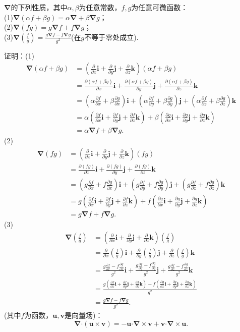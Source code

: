 \documentclass[12pt,UTF8]{ctexart}
\newcommand{\pp}[2]{\frac{\partial #1}{\partial #2}}
\begin{document}
\begin{enumerate}
$\bm\nabla$的下列性质，其中$\alpha,\beta$为任意常数，$f,g$为任意可微函数：\\
(1)$\bm\nabla(\alpha f+\beta g)=\alpha\bm\nabla+\beta\bm\nabla g$；\\
(2)$\bm\nabla(fg)=g\bm\nabla f+f\bm\nabla g$；\\
(3)$\bm\nabla(\frac fg)=\frac{g\bm\nabla f-f\bm\nabla g}{g^2}$(在$g$不等于零处成立).

证明：(1)\[\begin{split}
\bm\nabla(\alpha f+\beta g)&=(\pp{}x\bm i+\pp{}y\bm j+\pp{}z\bm k)(\alpha f+\beta g)\\
&=\pp{(\alpha f+\beta g)}x\bm i+\pp{(\alpha f+\beta g)}y\bm j+\pp{(\alpha f+\beta g)}z\bm k\\
&=(\alpha\pp fx+\beta\pp gx)\bm i+(\alpha\pp fy+\beta\pp gy)\bm j+(\alpha\pp fz+\beta\pp gz)\bm k\\
&=\alpha(\pp fx\bm i+\pp fy\bm j+\pp fz\bm k)+\beta(\pp gx\bm i+\pp gy\bm j+\pp gz\bm k)\\
&=\alpha\bm\nabla f+\beta\bm\nabla g.
\end{split}\]
(2)\[\begin{split}
\bm\nabla(fg)&=(\pp{}x\bm i+\pp{}y\bm j+\pp{}z\bm k)(fg)\\
&=\pp{(fg)}x\bm i+\pp{(fg)}y\bm j+\pp{(fg)}z\bm k\\
&=(g\pp fx+f\pp gx)\bm i+(g\pp fy+f\pp gy)\bm j+(g\pp fz+f\pp gz)\bm k\\
&=g(\pp fx\bm i+\pp fy\bm j+\pp fz\bm k)+f(\pp gx\bm i+\pp gy\bm j+\pp gz\bm k)\\
&=g\bm\nabla f+f\bm\nabla g.
\end{split}\]
(3)\[\begin{split}
\bm\nabla(\frac fg)&=(\pp{}x\bm i+\pp{}y\bm j+\pp{}z\bm k)(\frac fg)\\
&=\pp{}x(\frac fg)\bm i+\pp{}y(\frac fg)\bm j+\pp{}z(\frac fg)\bm k\\
&=\frac{g\pp fx-f\pp gx}{g^2}\bm i+\frac{g\pp fy-f\pp gy}{g^2}\bm j+\frac{g\pp fz-f\pp gz}{g^2}\bm k\\
&=\frac{g(\pp fx\bm i+\pp fy\bm j+\pp fz\bm k)-f(\pp gx\bm i+\pp gy\bm j+\pp gz\bm k)}{g^2}\\
&=\frac{g\bm\nabla f-f\bm\nabla g}{g^2}.
\end{split}\]
(其中$f$为函数，$\bm u,\bm v$是向量场)：
\[\bm\nabla\bm\cdot(\bm u\times\bm v)=-\bm u\bm\cdot\bm\nabla\times\bm v+\bm v\bm\cdot\bm\nabla\times\bm u.\]

\end{enumerate}
\end{document}

